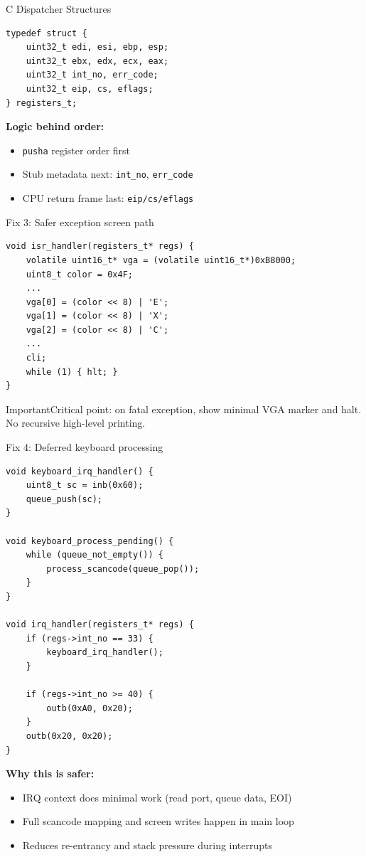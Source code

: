 \documentclass[aspectratio=169]{beamer}
\newcommand{\warn}[1]{%
  \begin{alertblock}{Important}\smallskip #1\smallskip\end{alertblock}\vspace{5pt}}
\begin{document}
\begin{frame}[fragile]{C Dispatcher Structures}
  \begin{lstlisting}[style=clang]
typedef struct {
    uint32_t edi, esi, ebp, esp;
    uint32_t ebx, edx, ecx, eax;
    uint32_t int_no, err_code;
    uint32_t eip, cs, eflags;
} registers_t;
  \end{lstlisting}
  \textbf{Logic behind order:}
  \begin{itemize}
    \item \texttt{pusha} register order first
    \item Stub metadata next: \texttt{int\_no}, \texttt{err\_code}
    \item CPU return frame last: \texttt{eip/cs/eflags}
  \end{itemize}
\end{frame}

\begin{frame}[fragile]{Fix 3: Safer exception screen path}
  \begin{lstlisting}[style=clang]
void isr_handler(registers_t* regs) {
    volatile uint16_t* vga = (volatile uint16_t*)0xB8000;
    uint8_t color = 0x4F;
    ...
    vga[0] = (color << 8) | 'E';
    vga[1] = (color << 8) | 'X';
    vga[2] = (color << 8) | 'C';
    ...
    cli;
    while (1) { hlt; }
}
  \end{lstlisting}
  \warn{Critical point: on fatal exception, show minimal VGA marker and halt. No recursive high-level printing.}
\end{frame}

\begin{frame}[fragile]{Fix 4: Deferred keyboard processing}
  \begin{lstlisting}[style=clang]
void keyboard_irq_handler() {
    uint8_t sc = inb(0x60);
    queue_push(sc);
}

void keyboard_process_pending() {
    while (queue_not_empty()) {
        process_scancode(queue_pop());
    }
}

void irq_handler(registers_t* regs) {
    if (regs->int_no == 33) {
        keyboard_irq_handler();
    }

    if (regs->int_no >= 40) {
        outb(0xA0, 0x20);
    }
    outb(0x20, 0x20);
}
  \end{lstlisting}
  \textbf{Why this is safer:}
  \begin{itemize}
    \item IRQ context does minimal work (read port, queue data, EOI)
    \item Full scancode mapping and screen writes happen in main loop
    \item Reduces re-entrancy and stack pressure during interrupts
  \end{itemize}
\end{frame}
\end{document}
